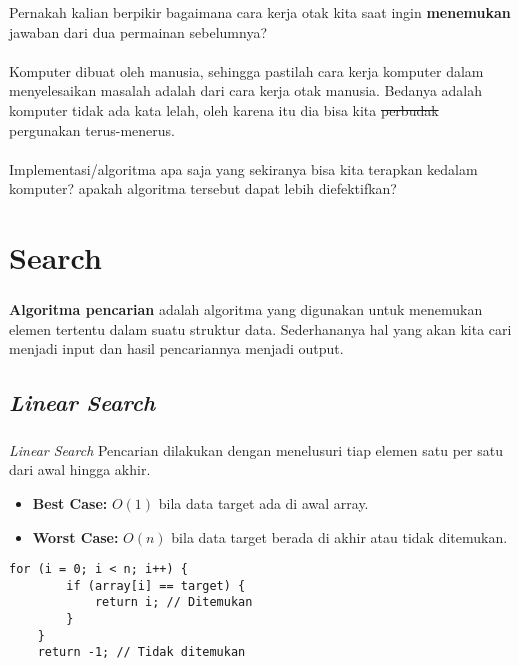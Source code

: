 \documentclass{../praktikum-ppt}
\begin{document}
    \begin{frame}
      \begin{masalah}
        Pernakah kalian berpikir bagaimana cara kerja otak kita saat ingin \textbf{menemukan} jawaban dari dua permainan sebelumnya?\\~\\

        Komputer dibuat oleh manusia, sehingga pastilah cara kerja komputer dalam menyelesaikan masalah adalah dari cara kerja otak manusia. Bedanya adalah komputer tidak ada kata lelah, oleh karena itu dia bisa kita \st{perbudak} pergunakan terus-menerus.\\~\\

        Implementasi/algoritma apa saja yang sekiranya bisa kita terapkan kedalam komputer? apakah algoritma tersebut dapat lebih diefektifkan?
      \end{masalah}
    \end{frame}

    \section{Search}
    \begin{frame}
        \frametitle{\insertsection}
        \begin{definisi}
          \textbf{Algoritma pencarian} adalah algoritma yang digunakan untuk menemukan elemen tertentu dalam suatu struktur data. Sederhananya hal yang akan kita cari menjadi \textcolor{HIMAtua}{input} dan hasil pencariannya menjadi \textcolor{HIMAtua}{output}.
        \end{definisi}
    \end{frame}

    \subsection{\textit{Linear Search}}
    \begin{frame}[fragile]
      \frametitle{\insertsection}
      \framesubtitle{\insertsubsection}
      \begin{block}{\textit{Linear Search}}
          Pencarian dilakukan dengan menelusuri tiap elemen satu per satu dari awal hingga akhir.
          \begin{itemize}
              \item \textbf{Best Case:} \(O(1)\) bila data target ada di awal array.
              \item \textbf{Worst Case:} \(O(n)\) bila data target berada di akhir atau tidak ditemukan.
          \end{itemize}
      \end{block}
      
          \begin{lstlisting}[caption={Pseudocode Linear Search}]
    for (i = 0; i < n; i++) {
        if (array[i] == target) {
            return i; // Ditemukan
        }
    }
    return -1; // Tidak ditemukan
          \end{lstlisting}
    \end{frame}
\end{document}
